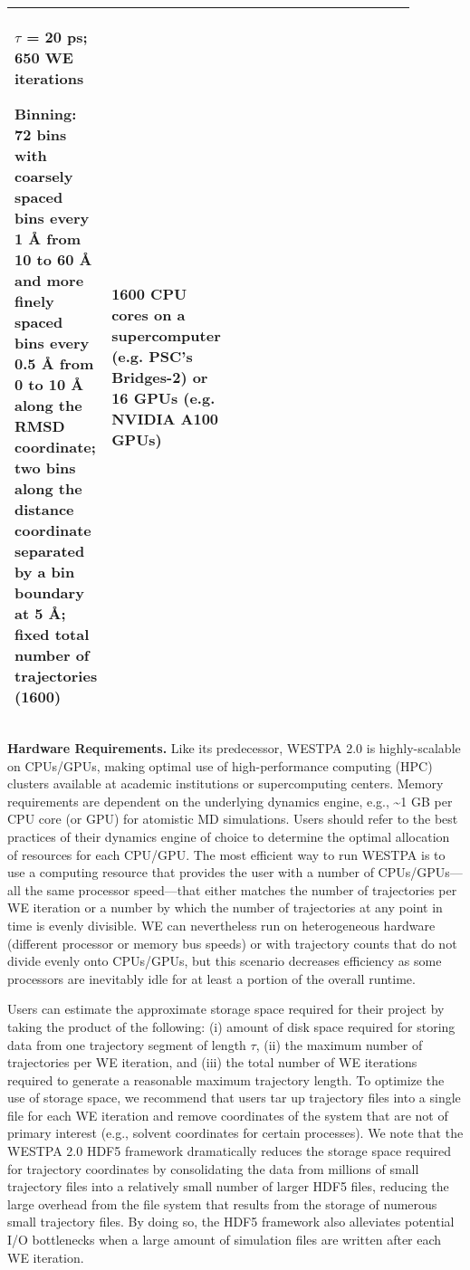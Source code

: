 \begin{table*}
\begin{tabular}{ | p{0.11\linewidth} | p{0.30\linewidth} | p{0.30\linewidth} | p{0.17\linewidth} |}
$\tau$ = 20 ps; 650 WE iterations

Binning: 72 bins with coarsely spaced bins every 1 \AA{} from 10 to 60 \AA{} and more finely spaced bins every 0.5 \AA{} from 0 to 10 \AA{} along the RMSD coordinate; two bins along the distance coordinate separated by a bin boundary at 5 \AA{}; fixed total number of trajectories (1600)& 
1600 CPU cores on a supercomputer (e.g. PSC’s Bridges-2) or 16 GPUs (e.g. NVIDIA A100 GPUs) \\
\hline
\end{tabular}
\end{table*}

\textbf{Hardware Requirements.} Like its predecessor, WESTPA 2.0 is highly-scalable on CPUs/GPUs, making optimal use of high-performance computing (HPC) clusters available at academic institutions or supercomputing centers. 
Memory requirements are dependent on the underlying dynamics engine, e.g., \textasciitilde1 GB per CPU core (or GPU) for atomistic MD simulations. 
Users should refer to the best practices of their dynamics engine of choice to determine the optimal allocation of resources for each CPU/GPU. 
The most efficient way to run WESTPA is to use a computing resource that provides the user with a number of CPUs/GPUs---all the same processor speed---that either matches the number of trajectories per WE iteration or a number by which the number of trajectories at any point in time is evenly divisible. 
WE can nevertheless run on heterogeneous hardware (different processor or memory bus speeds) or with trajectory counts that do not divide evenly onto CPUs/GPUs, but this scenario decreases efficiency as some processors are inevitably idle for at least a portion of the overall runtime.

Users can estimate the approximate storage space required for their project by taking the product of the following: (i) amount of disk space required for storing data from one trajectory segment of length $\tau$, (ii) the maximum number of trajectories per WE iteration, and (iii) the total number of WE iterations required to generate a reasonable maximum trajectory length. 
To optimize the use of storage space, we recommend that users tar up trajectory files into a single file for each WE iteration and remove coordinates of the system that are not of primary interest (e.g., solvent coordinates for certain processes). 
We note that the WESTPA 2.0 HDF5 framework dramatically reduces the storage space required for trajectory coordinates by consolidating the data from millions of small trajectory files into a relatively small number of larger HDF5 files, reducing the large overhead from the file system that results from the storage of numerous small trajectory files. 
By doing so, the HDF5 framework also alleviates potential I/O bottlenecks when a large amount of simulation files are written after each WE iteration. 